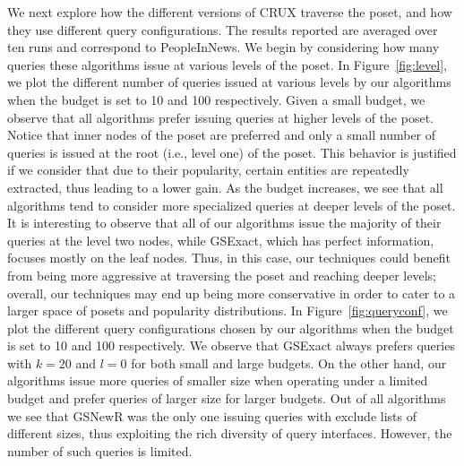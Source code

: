 \vspace{3pt}
We next explore how the different versions of CRUX traverse the poset, and how they use different query configurations. The results reported are averaged over ten runs and correspond to PeopleInNews. We begin by considering how many queries these algorithms issue at various levels of the poset. In Figure~\ref{fig:level}, we plot the different number of queries issued at various levels by our algorithms when the budget is set to 10 and 100 respectively. Given a small budget, we observe that all algorithms prefer issuing queries at higher levels of the poset. Notice that inner nodes of the poset are preferred and only a small number of queries is issued at the root (i.e., level one) of the poset. This behavior is justified if we consider that due to their popularity, certain entities are repeatedly extracted, thus leading to a lower gain. As the budget increases, we see that all algorithms tend to consider more specialized queries at deeper levels of the poset. It is interesting to observe that all of our algorithms issue the majority of their queries at the level two nodes, while GSExact, which has perfect information, focuses mostly on the leaf nodes. Thus, in this case, our techniques could benefit from being more aggressive at traversing the poset and reaching deeper levels; overall, our techniques may end up being more conservative in order to cater to a larger space of posets and popularity distributions. In Figure~\ref{fig:queryconf}, we plot the different query configurations chosen by our algorithms when the budget is set to 10 and 100 respectively. We observe that GSExact always prefers queries with $k = 20$ and $l = 0$ for both small and large budgets. On the other hand, our algorithms issue more queries of smaller size when operating under a limited budget and prefer queries of larger size for larger budgets. Out of all algorithms we see that GSNewR was the only one issuing queries with exclude lists of different sizes, thus exploiting the rich diversity of query interfaces. However, the number of such queries is limited. 


